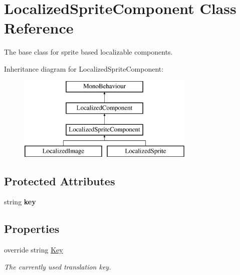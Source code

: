 \hypertarget{class_localized_sprite_component}{}\section{Localized\+Sprite\+Component Class Reference}
\label{class_localized_sprite_component}


The base class for sprite based localizable components.  


Inheritance diagram for Localized\+Sprite\+Component\+:\begin{figure}[H]
\begin{center}
\leavevmode
\includegraphics[height=4.000000cm]{class_localized_sprite_component}
\end{center}
\end{figure}
\subsection*{Protected Attributes}
\begin{DoxyCompactItemize}
\item 
string {\bfseries key}\hypertarget{class_localized_sprite_component_a351d58ff200cc09f48c6f3d554df6da9}{}\label{class_localized_sprite_component_a351d58ff200cc09f48c6f3d554df6da9}

\end{DoxyCompactItemize}
\subsection*{Properties}
\begin{DoxyCompactItemize}
\item 
override string \hyperlink{class_localized_sprite_component_aec3112583fae350f76cc368490358bcf}{Key}
\begin{DoxyCompactList}\small\item\em The currently used translation key. \end{DoxyCompactList}\end{DoxyCompactItemize}
